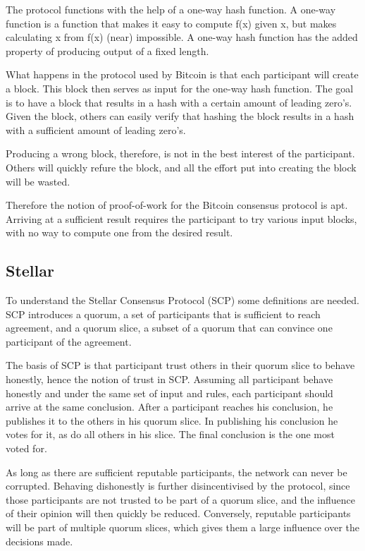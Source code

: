 \documentclass[12pt]{report}
\theoremstyle{plain}
\theoremstyle{definition}
\begin{document}
	The protocol functions with the help of a one-way hash function. A one-way function is a function that makes it easy to compute f(x) given x, but makes calculating x from f(x) (near) impossible. A one-way hash function has the added property of producing output of a fixed length.
	
	What happens in the protocol used by Bitcoin is that each participant will create a block. This block then serves as input for the one-way hash function. The goal is to have a block that results in a hash with a certain amount of leading zero's. Given the block, others can easily verify that hashing the block results in a hash with a sufficient amount of leading zero's.
	
	Producing a wrong block, therefore, is not in the best interest of the participant. Others will quickly refure the block, and all the effort put into creating the block will be wasted.
	
	Therefore the notion of proof-of-work for the Bitcoin consensus protocol is apt. Arriving at a sufficient result requires the participant to try various input blocks, with no way to compute one from the desired result.
	
	\subsection{Stellar}
	To understand the Stellar Consensus Protocol\cite{stellarconsensus} (SCP) some definitions are needed. SCP introduces a quorum, a set of participants that is sufficient to reach agreement, and a quorum slice, a subset of a quorum that can convince one participant of the agreement.
	
	The basis of SCP is that participant trust others in their quorum slice to behave honestly, hence the notion of trust in SCP. Assuming all participant behave honestly and under the same set of input and rules, each participant should arrive at the same conclusion. After a participant reaches his conclusion, he publishes it to the others in his quorum slice. In publishing his conclusion he votes for it, as do all others in his slice. The final conclusion is the one most voted for.
	
	As long as there are sufficient reputable participants, the network can never be corrupted. Behaving dishonestly is further disincentivised by the protocol, since those participants are not trusted to be part of a quorum slice, and the influence of their opinion will then quickly be reduced. Conversely, reputable participants will be part of multiple quorum slices, which gives them a large influence over the decisions made.
	
\end{document}

